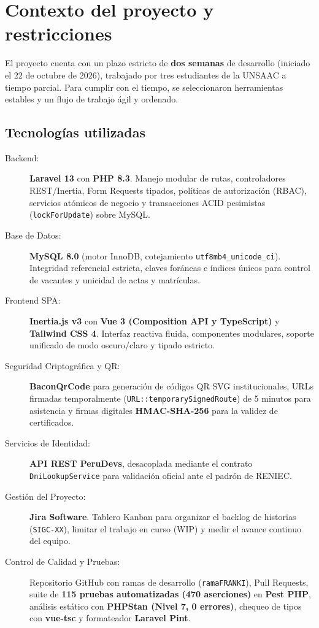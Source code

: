 \section{Contexto del proyecto y restricciones}

El proyecto cuenta con un plazo estricto de \textbf{dos semanas} de desarrollo (iniciado el 22 de octubre de 2026), trabajado por tres estudiantes de la UNSAAC a tiempo parcial. Para cumplir con el tiempo, se seleccionaron herramientas estables y un flujo de trabajo ágil y ordenado.

\subsection{Tecnologías utilizadas}

\begin{description}
    \item[Backend:] \textbf{Laravel 13} con \textbf{PHP 8.3}. Manejo modular de rutas, controladores REST/Inertia, Form Requests tipados, políticas de autorización (RBAC), servicios atómicos de negocio y transacciones ACID pesimistas (\texttt{lockForUpdate}) sobre MySQL.
    \item[Base de Datos:] \textbf{MySQL 8.0} (motor InnoDB, cotejamiento \texttt{utf8mb4\_unicode\_ci}). Integridad referencial estricta, claves foráneas e índices únicos para control de vacantes y unicidad de actas y matrículas.
    \item[Frontend SPA:] \textbf{Inertia.js v3} con \textbf{Vue 3 (Composition API y TypeScript)} y \textbf{Tailwind CSS 4}. Interfaz reactiva fluida, componentes modulares, soporte unificado de modo oscuro/claro y tipado estricto.
    \item[Seguridad Criptográfica y QR:] \textbf{BaconQrCode} para generación de códigos QR SVG institucionales, URLs firmadas temporalmente (\texttt{URL::temporarySignedRoute}) de 5 minutos para asistencia y firmas digitales \textbf{HMAC-SHA-256} para la validez de certificados.
    \item[Servicios de Identidad:] \textbf{API REST PeruDevs}, desacoplada mediante el contrato \texttt{DniLookupService} para validación oficial ante el padrón de RENIEC.
    \item[Gestión del Proyecto:] \textbf{Jira Software}. Tablero Kanban para organizar el backlog de historias (\texttt{SIGC-XX}), limitar el trabajo en curso (WIP) y medir el avance continuo del equipo.
    \item[Control de Calidad y Pruebas:] Repositorio GitHub con ramas de desarrollo (\texttt{ramaFRANKI}), Pull Requests, suite de \textbf{115 pruebas automatizadas (470 aserciones)} en \textbf{Pest PHP}, análisis estático con \textbf{PHPStan (Nivel 7, 0 errores)}, chequeo de tipos con \textbf{vue-tsc} y formateador \textbf{Laravel Pint}.
\end{description}

